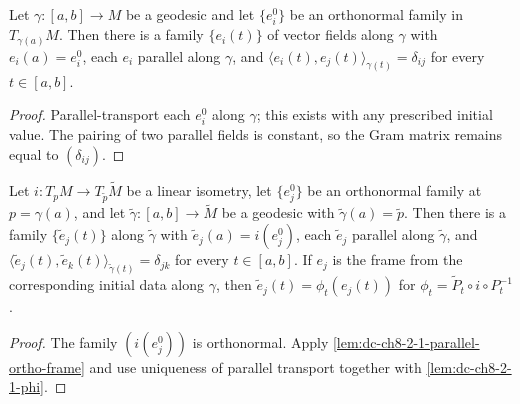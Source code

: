 \begin{lemma}
  \label{lem:dc-ch8-2-1-parallel-ortho-frame}


  Let $\gamma:[a,b]\to M$ be a geodesic and let $\{e^0_i\}$ be an orthonormal family in
  $T_{\gamma(a)}M$. Then there is a family $\{e_i(t)\}$ of vector fields along $\gamma$ with
  $e_i(a)=e^0_i$, each $e_i$ parallel along $\gamma$, and
  $\langle e_i(t),e_j(t)\rangle_{\gamma(t)}=\delta_{ij}$ for every $t\in[a,b]$.
\end{lemma}
\begin{proof}

\sketch
  Parallel-transport each $e^0_i$ along $\gamma$; this exists with any prescribed initial
  value. The pairing of two parallel fields is constant, so the Gram matrix remains
  equal to $(\delta_{ij})$.
\end{proof}

\begin{lemma}
  \label{lem:dc-ch8-2-1-transported-frame}

  Let $i:T_pM\to T_{\tilde p}\tilde M$ be a linear isometry, let $\{e^0_j\}$ be an orthonormal
  family at $p=\gamma(a)$, and let $\tilde\gamma:[a,b]\to\tilde M$ be a geodesic with
  $\tilde\gamma(a)=\tilde p$. Then there is a family $\{\tilde e_j(t)\}$ along $\tilde\gamma$
  with $\tilde e_j(a)=i(e^0_j)$, each $\tilde e_j$ parallel along $\tilde\gamma$, and
  $\langle\tilde e_j(t),\tilde e_k(t)\rangle_{\tilde\gamma(t)}=\delta_{jk}$ for every
  $t\in[a,b]$. If $e_j$ is the frame from the corresponding initial data along
  $\gamma$, then $\tilde e_j(t)=\phi_t(e_j(t))$ for
  $\phi_t=\tilde P_t\circ i\circ P_t^{-1}$.
\end{lemma}
\begin{proof}

\sketch
  The family $(i(e_j^0))$ is orthonormal. Apply
  \cref{lem:dc-ch8-2-1-parallel-ortho-frame} and use uniqueness of parallel
  transport together with \cref{lem:dc-ch8-2-1-phi}.
\end{proof}

